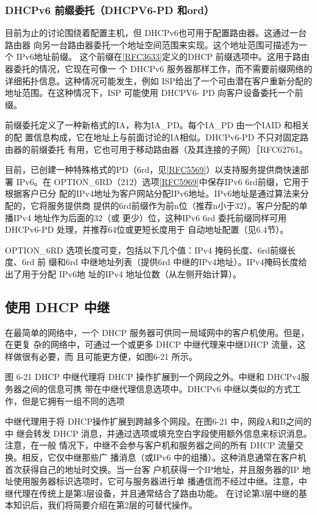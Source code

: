 \subsubsection{DHCPv6 前缀委托（DHCPV6-PD 和ord）}
目前为止的讨论围绕着配置主机，但 DHCPv6也可用于配置路由器。这通过一台路由器
向另一台路由器委托一个地址空间范围来实现。这个地址范围可描述为一个 IPv6地址前缀。
这个前缀在\href{https://www.rfc-editor.org/rfc/rfc3633}{\href{https://www.rfc-editor.org/rfc/rfc3633}{[RFC3633]}}定义的DHCP
前缀选项中。这用于路由器委托的情况，它现在可像一
个 DHCPv6 服务器那样工作，而不需要前缀网络的详细拓扑信息。这种情况可能发生，例如
ISP给出了一个可由潜在客户重新分配的地址范围。在这种情况下，ISP 可能使用 DHCPV6-
PD 向客户设备委托一个前缀。

前缀委托定义了一种新格式的IA，称为IA\_PD。每个IA\_PD 由一个IAID 和相关的配
置信息构成，它在地址上与前面讨论的IA相似。DHCPv6-PD 不只对固定路由器的前缀委托
有用，它也可用于移动路由器（及其连接的子网）［RFC62761。

目前，已创建一种特殊格式的PD（6rd，见\href{https://www.rfc-editor.org/rfc/rfc5569}{\href{https://www.rfc-editor.org/rfc/rfc5569}{[RFC5569]}}）以支持服务提供商快速部署
IPv6。在
OPTION\_6RD（212）选项\href{https://www.rfc-editor.org/rfc/rfc5969}{\href{https://www.rfc-editor.org/rfc/rfc5969}{[RFC5969]}}中保存IPv6
6rd前缀，它用于根据客户已分
配的IPv4地址为客户网站分配IPv6地址。IPv6地址是通过算法来分配的，它将服务提供商
提供的6rd前缀作为前n位（推荐n小于32）。客户分配的单播IPv4 地址作为后面的32（或
更少）位，这种IPv6 6rd 委托前缀同样可用DHCPv6-PD 处理，并推荐64位或更短长度用于
自动地址配置（见6.4节）。

OPTION\_6RD 选项长度可变，包括以下几个值：IPv4 掩码长度、6rd前缀长度、6rd 前
缀和6rd 中继地址列表（提供6rd 中继的IPv4地址）。IPv4掩码长度给出了用于分配 IPv6地
址的IPv4 地址位数（从左侧开始计算）。

\subsection{使用 DHCP 中继}
在最简单的网络中，一个 DHCP 服务器可供同一局域网中的客户机使用。但是，在更复
杂的网络中，可通过一个或更多 DHCP 中继代理来中继DHCP 流量，这样做很有必要，而
且可能更方便，如图6-21 所示。

图 6-21
DHCP 中继代理将 DHCP 操作扩展到一个网段之外。中继和 DHCPv4服务器之间的信息可携
带在中继代理信息选项中。DHCPv6 中继以类似的方式工作，但是它拥有一组不同的选项

中继代理用于将 DHCP操作扩展到跨越多个网段。在图6-21 中，网段A和B之间的中
继会转发 DHCP 消息，并通过选项或填充空白字段使用额外信息来标识消息。注意，在一般
情况下，中继不会参与客户机和服务器之间的所有 DHCP 流量交换。相反，它仅中继那些广
播消息（或IPv6 中的组播）。这种消息通常在客户机首次获得自己的地址时交换。当一台客
户机获得一个IP地址，并且服务器的IP 地址使用服务器标识选项时，它可与服务器进行单
播通信而不经过中继。注意，中继代理在传统上是第3层设备，并且通常结合了路由功能。
在讨论第3层中继的基本知识后，我们将简要介绍在第2层的可替代操作。

